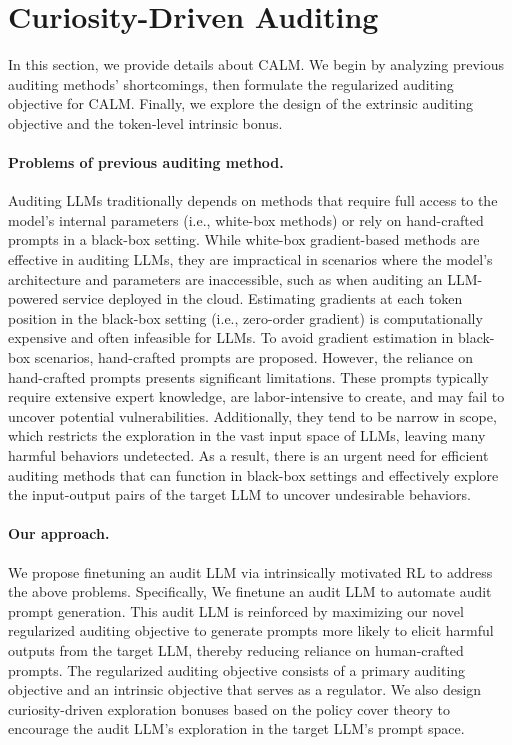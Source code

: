 \documentclass[letterpaper]{article} %
\newcommand{\ours}{\textsf{CALM}}
\begin{document}
\section{Curiosity-Driven Auditing}

In this section, we provide details about {\ours}. We begin by analyzing previous auditing methods' shortcomings, then formulate the regularized auditing objective for {\ours}. Finally, we explore the design of the extrinsic auditing objective and the token-level intrinsic bonus.

\paragraph{Problems of previous auditing method.} Auditing LLMs traditionally depends on methods that require full access to the model's internal parameters (i.e., white-box methods) or rely on hand-crafted prompts in a black-box setting. While white-box gradient-based methods are effective in auditing LLMs, they are impractical in scenarios where the model's architecture and parameters are inaccessible, such as when auditing an LLM-powered service deployed in the cloud. Estimating gradients at each token position in the black-box setting (i.e., zero-order gradient) is computationally expensive and often infeasible for LLMs. To avoid gradient estimation in black-box scenarios, hand-crafted prompts are proposed. However, the reliance on hand-crafted prompts presents significant limitations. These prompts typically require extensive expert knowledge, are labor-intensive to create, and may fail to uncover potential vulnerabilities. Additionally, they tend to be narrow in scope, which restricts the exploration in the vast input space of LLMs, leaving many harmful behaviors undetected. As a result, there is an urgent need for efficient auditing methods that can function in black-box settings and effectively explore the input-output pairs of the target LLM to uncover undesirable behaviors.

\paragraph{Our approach.} We propose finetuning an audit LLM via intrinsically motivated RL to address the above problems. Specifically, We finetune an audit LLM to automate audit prompt generation. This audit LLM is reinforced by maximizing our novel regularized auditing objective to generate prompts more likely to elicit harmful outputs from the target LLM, thereby reducing reliance on human-crafted prompts. The regularized auditing objective consists of a primary auditing objective and an intrinsic objective that serves as a regulator. We also design curiosity-driven exploration bonuses based on the policy cover theory to encourage the audit LLM's exploration in the target LLM's prompt space.
\end{document}
